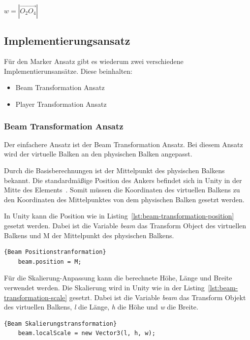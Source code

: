 $w = |\vec{O_{2}O_{4}}|$

\subsection{Implementierungsansatz}
\label{subsec:implementierungsansatz}

Für den Marker Ansatz gibt es wiederum zwei verschiedene Implementierunsansätze.
Diese beinhalten:

\begin{itemize}
    \item Beam Transformation Ansatz
    \item Player Transformation Ansatz
\end{itemize}

\subsubsection{Beam Transformation Ansatz}

Der einfachere Ansatz ist der Beam Transformation Ansatz.
Bei diesem Ansatz wird der virtuelle Balken an den physischen Balken angepasst.

Durch die Basisberechnungen ist der Mittelpunkt des physischen Balkens bekannt.
Die standardmäßige Position des Ankers befindet sich in Unity in der Mitte des Elements~\cite{AM_APPS_2020}.
Somit müssen die Koordinaten des virtuellen Balkens zu den Koordinaten des Mittelpunktes von dem physischen Balken gesetzt werden.

In Unity kann die Position wie in Listing~\ref{lst:beam-transformation-position} gesetzt werden.
Dabei ist die Variable \emph{beam} das Transform Object des virtuellen Balkens und M der Mittelpunkt des physischen Balkens.


\begin{lstlisting}[language={[Sharp]C},label={lst:beam-transformation-position}, caption={Beam Positionstranformation}]{Beam Positionstranformation}
    beam.position = M;
\end{lstlisting}

Für die Skalierung-Anpassung kann die berechnete Höhe, Länge und Breite verwendet werden.
Die Skalierung wird in Unity wie in der Listing~\ref{lst:beam-transformation-scale} gesetzt.
Dabei ist die Variable \emph{beam} das Transform Objekt des virtuellen Balkens, \emph{l}  die Länge, \emph{h} die Höhe und \emph{w} die Breite.

\begin{lstlisting}[language={[Sharp]C},label={lst:beam-transformation-scale}, caption={Beam Skalierungstransformation}]{Beam Skalierungstransformation}
    beam.localScale = new Vector3(l, h, w);
\end{lstlisting}

